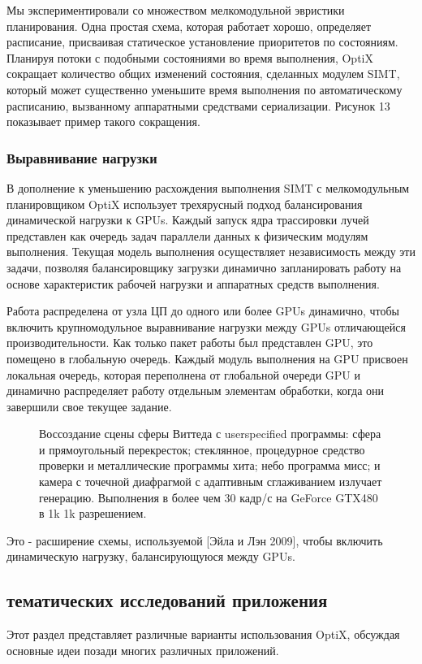 Мы экспериментировали со множеством мелкомодульной эвристики планирования. Одна простая схема, которая работает хорошо, определяет расписание, присваивая статическое установление приоритетов по состояниям. Планируя потоки с подобными состояниями во время выполнения, OptiX сокращает количество общих изменений состояния, сделанных модулем SIMT, который может существенно
уменьшите время выполнения по автоматическому расписанию, вызванному аппаратными средствами сериализации. Рисунок 13 показывает пример такого сокращения.
\subsubsection{ Выравнивание нагрузки}
В дополнение к уменьшению расхождения выполнения SIMT с мелкомодульным планировщиком OptiX использует трехярусный подход балансирования динамической нагрузки к GPUs. Каждый запуск ядра трассировки лучей представлен как очередь задач параллели данных к физическим модулям выполнения. Текущая модель выполнения осуществляет независимость между
эти задачи, позволяя балансировщику загрузки динамично запланировать работу на основе характеристик рабочей нагрузки и аппаратных средств выполнения.

Работа распределена от узла ЦП до одного или более GPUs динамично, чтобы включить крупномодульное выравнивание нагрузки между GPUs отличающейся производительности. Как только пакет работы был представлен GPU, это помещено в глобальную очередь. Каждый модуль выполнения на GPU присвоен локальная очередь, которая переполнена от глобальной очереди GPU и динамично распределяет работу отдельным элементам обработки, когда они завершили свое текущее задание. 
\begin{figure}[h!]
\caption{Воссоздание сцены сферы Виттеда с userspecified программы: сфера и прямоугольный перекресток; стеклянное, процедурное средство проверки и металлические программы хита; небо программа мисс; и камера с точечной диафрагмой с адаптивным сглаживанием излучает генерацию. Выполнения в более чем 30 кадр/с на GeForce GTX480 в 1k 1k разрешением.}
\label{fig5}
\end{figure}
Это - расширение схемы, используемой [Эйла и Лэн 2009], чтобы включить динамическую нагрузку, балансирующуюся между GPUs.

\subsection{тематических исследований приложения}
Этот раздел представляет различные варианты использования OptiX, обсуждая основные идеи позади многих различных приложений.

